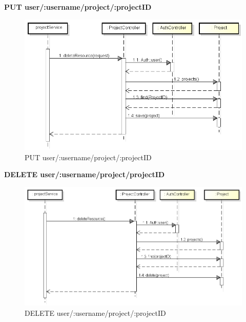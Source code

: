 \newpage

\textbf{PUT user/:username/project/:projectID}
	\begin{figure}[h]
		\centering
		\includegraphics[width=0.6\linewidth]{img/PUT_project}
		\caption[PUT user/:username/project/:projectID]{PUT user/:username/project/:projectID}
		\label{fig:PUT user/:username/project/projectID}
	\end{figure}

\textbf{DELETE user/:username/project/projectID}
	\begin{figure}[h]
		\centering
		\includegraphics[width=0.6\linewidth]{img/DELETE_project}
		\caption[DELETE user/:username/project/:projectID]{DELETE user/:username/project/:projectID}
		\label{fig:DELETE user/:username/project/:projectID}
	\end{figure}